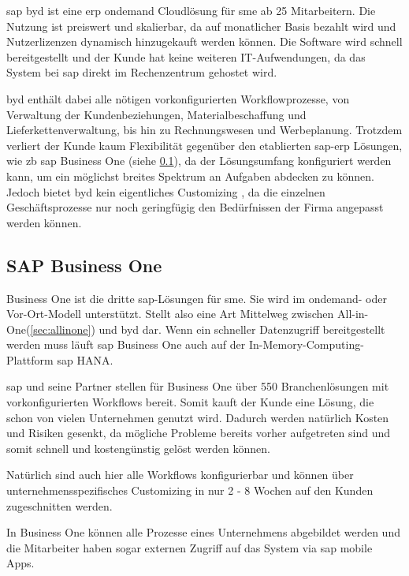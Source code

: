 \gls{sap} \gls{byd} ist eine \gls{erp} \gls{ondemand} Cloudlösung für \gls{sme} ab 25 Mitarbeitern. Die Nutzung ist preiswert und skalierbar, da auf monatlicher Basis bezahlt wird und Nutzerlizenzen dynamisch hinzugekauft werden können. Die Software wird schnell bereitgestellt und der Kunde hat keine weiteren IT-Aufwendungen, da das System bei \gls{sap} direkt im Rechenzentrum gehostet wird.

\gls{byd} enthält dabei alle nötigen vorkonfigurierten Workflowprozesse, von Verwaltung der Kundenbeziehungen, Materialbeschaffung und Lieferkettenverwaltung, bis hin zu Rechnungswesen und Werbeplanung. Trotzdem verliert der Kunde kaum Flexibilität gegenüber den etablierten \gls{sap}-\gls{erp} Lösungen, wie \gls{zb} \gls{sap} Business One (siehe \ref{sec:business-one}), da der Lösungsumfang konfiguriert werden kann, um ein möglichst breites Spektrum an Aufgaben abdecken zu können. Jedoch bietet \gls{byd} kein eigentliches Customizing \cite{ERP4Students}, da die einzelnen Geschäftsprozesse nur noch geringfügig den Bedürfnissen der Firma angepasst werden können.

\subsection{SAP Business One}
\label{sec:business-one}

Business One ist die dritte \gls{sap}-Lösungen für \gls{sme}. Sie wird im \gls{ondemand}- oder Vor-Ort-Modell unterstützt. Stellt also eine Art Mittelweg zwischen All-in-One(\ref{sec:allinone}) und \gls{byd} dar. Wenn ein schneller Datenzugriff bereitgestellt werden muss läuft \gls{sap} Business One auch auf der In-Memory-Computing-Plattform \gls{sap} HANA.

\gls{sap} und seine Partner stellen für Business One über 550 Branchenlösungen mit vorkonfigurierten Workflows bereit. Somit kauft der Kunde eine Lösung, die schon von vielen Unternehmen genutzt wird. Dadurch werden natürlich Kosten und Risiken gesenkt, da mögliche Probleme bereits vorher aufgetreten sind und somit schnell und kostengünstig gelöst werden können.

Natürlich sind auch hier alle Workflows konfigurierbar und können über unternehmensspezifisches Customizing in nur 2 - 8 Wochen auf den Kunden zugeschnitten werden.\cite{BusinessOne}

In Business One können alle Prozesse eines Unternehmens abgebildet werden und die Mitarbeiter haben sogar externen Zugriff auf das System via \gls{sap} mobile Apps.

